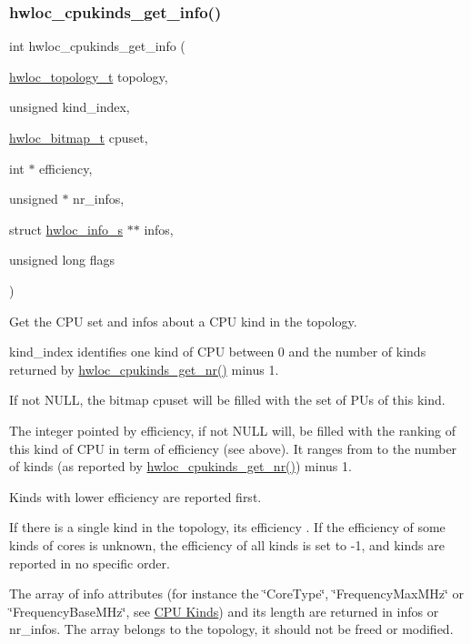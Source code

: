 \subsubsection{\texorpdfstring{hwloc\+\_\+cpukinds\+\_\+get\+\_\+info()}{hwloc\_cpukinds\_get\_info()}}
{\footnotesize\ttfamily int hwloc\+\_\+cpukinds\+\_\+get\+\_\+info (\begin{DoxyParamCaption}\item[{\hyperlink{a00186_ga9d1e76ee15a7dee158b786c30b6a6e38}{hwloc\+\_\+topology\+\_\+t}}]{topology,  }\item[{unsigned}]{kind\+\_\+index,  }\item[{\hyperlink{a00205_gaa3c2bf4c776d603dcebbb61b0c923d84}{hwloc\+\_\+bitmap\+\_\+t}}]{cpuset,  }\item[{int $\ast$}]{efficiency,  }\item[{unsigned $\ast$}]{nr\+\_\+infos,  }\item[{struct \hyperlink{a00286}{hwloc\+\_\+info\+\_\+s} $\ast$$\ast$}]{infos,  }\item[{unsigned long}]{flags }\end{DoxyParamCaption})}



Get the C\+PU set and infos about a C\+PU kind in the topology. 

{\ttfamily kind\+\_\+index} identifies one kind of C\+PU between 0 and the number of kinds returned by \hyperlink{a00213_ga7553f7c6d3920b169f3fc18dfe6a33e3}{hwloc\+\_\+cpukinds\+\_\+get\+\_\+nr()} minus 1.

If not {\ttfamily N\+U\+LL}, the bitmap {\ttfamily cpuset} will be filled with the set of P\+Us of this kind.

The integer pointed by {\ttfamily efficiency}, if not {\ttfamily N\+U\+LL} will, be filled with the ranking of this kind of C\+PU in term of efficiency (see above). It ranges from {} to the number of kinds (as reported by \hyperlink{a00213_ga7553f7c6d3920b169f3fc18dfe6a33e3}{hwloc\+\_\+cpukinds\+\_\+get\+\_\+nr()}) minus 1.

Kinds with lower efficiency are reported first.

If there is a single kind in the topology, its efficiency {}. If the efficiency of some kinds of cores is unknown, the efficiency of all kinds is set to {\ttfamily -\/1}, and kinds are reported in no specific order.

The array of info attributes (for instance the \char`\"{}\+Core\+Type\char`\"{}, \char`\"{}\+Frequency\+Max\+M\+Hz\char`\"{} or \char`\"{}\+Frequency\+Base\+M\+Hz\char`\"{}, see \hyperlink{a00387_topoattrs_cpukinds}{C\+PU Kinds}) and its length are returned in {\ttfamily infos} or {\ttfamily nr\+\_\+infos}. The array belongs to the topology, it should not be freed or modified.

